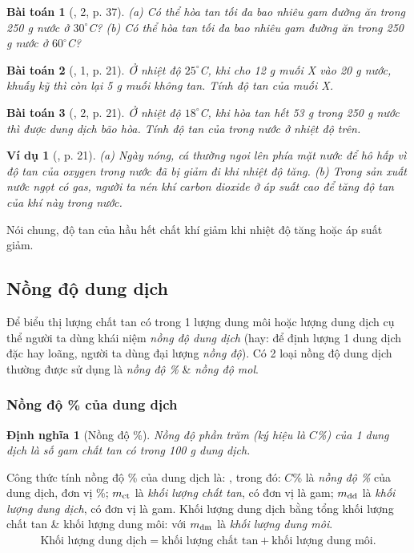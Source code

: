 \documentclass{article}
\newtheorem{baitoan}{Bài toán}
\newtheorem{dinhnghia}{Định nghĩa}
\newtheorem{vidu}{Ví dụ}
\begin{document}
\begin{baitoan}[\cite{SGK_KHTN_8_Canh_Dieu}, 2, p. 37]
	(a) Có thể hòa tan tối đa bao nhiêu gam đường ăn trong \emph{250 g} nước ở $30^\circ$C? (b) Có thể hòa tan tối đa bao nhiêu gam đường ăn trong \emph{250 g} nước ở $60^\circ$C?
\end{baitoan}

\begin{baitoan}[\cite{SGK_KHTN_8_KNTTVCS}, 1, p. 21]
	Ở nhiệt độ $25^\circ$C, khi cho \emph{12 g} muối X vào \emph{20 g} nước, khuấy kỹ thì còn lại \emph{5 g} muối không tan. Tính độ tan của muối X.
\end{baitoan}

\begin{baitoan}[\cite{SGK_KHTN_8_KNTTVCS}, 2, p. 21]
	Ở nhiệt độ $18^\circ$C, khi hòa tan hết \emph{53 g} \emph{} trong \emph{250 g} nước thì được dung dịch bão hòa. Tính độ tan của \emph{} trong nước ở nhiệt độ trên.
\end{baitoan}

\begin{vidu}[\cite{SGK_KHTN_8_KNTTVCS}, p. 21]
	(a) Ngày nóng, cá thường ngoi lên phía mặt nước để hô hấp vì độ tan của oxygen trong nước đã bị giảm đi khi nhiệt độ tăng. (b) Trong sản xuất nước ngọt có gas, người ta nén khí carbon dioxide ở áp suất cao để tăng độ tan của khí này trong nước.
\end{vidu}
Nói chung, độ tan của hầu hết chất khí giảm khi nhiệt độ tăng hoặc áp suất giảm.

\subsection{Nồng độ dung dịch}
Để biểu thị lượng chất tan có trong 1 lượng dung môi hoặc lượng dung dịch cụ thể người ta dùng khái niệm \textit{nồng độ dung dịch} (hay: để định lượng 1 dung dịch đặc hay loãng, người ta dùng đại lượng \textit{nồng độ}). Có 2 loại nồng độ dung dịch thường được sử dụng là \textit{nồng độ \%} \& \textit{nồng độ mol}.

\subsubsection{Nồng độ \% của dung dịch}

\begin{dinhnghia}[Nồng độ \%]
	\emph{Nồng độ phần trăm} (ký hiệu là $C$\%) của 1 dung dịch là số gam chất tan có trong \emph{100 g} dung dịch.
\end{dinhnghia}
Công thức tính nồng độ \% của dung dịch là: , trong đó: $C$\% là \textit{nồng độ \%} của dung dịch, đơn vị \%; $m_{\rm ct}$ là \textit{khối lượng chất tan}, có đơn vị là gam; $m_{\rm dd}$ là \textit{khối lượng dung dịch}, có đơn vị là gam. Khối lượng dung dịch bằng tổng khối lượng chất tan \& khối lượng dung môi:  với $m_{\rm dm}$ là \textit{khối lượng dung môi}.
\begin{align*}
	\mbox{Khối lượng dung dịch} = \mbox{khối lượng chất tan} + \mbox{khối lượng dung môi}.
\end{align*}
\end{document}
